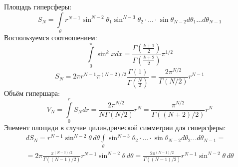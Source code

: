 Площадь гиперсферы:
\[
	S_N = \int\limits_{\theta} r^{N - 1} \sin^{N - 2} \theta_1 \sin^{N - 3} \theta_2 \cdot \ldots \cdot \sin \theta_{N - 2} d\theta_1 \ldots d\theta_{N - 1}
\]
Воспользуемся соотношением:
\[
	\int\limits_0^\pi \sin^k x dx = \frac{\Gamma\left(\frac{k + 1}{2}\right)}{\Gamma\left(\frac{k + 2}{2}\right)} \pi^{1/2}
\]
\[
	S_N = 2 \pi r^{N - 1} \pi^{(N - 2)/2} \frac{\Gamma(1)}{\Gamma\left(\frac{N}{2}\right)} =
	\frac{2 \pi^{N/2}}{\Gamma\left(N/2\right)} r^{N - 1}
\]
Объём гипершара:
\[
	V_N = \int\limits_0^r S_N dr = \frac{2 \pi^{N/2}}{N\Gamma\left(N/2\right)} r^{N} =
	\frac{\pi^{N/2}}{\Gamma\left((N + 2)/2\right)} r^{N}
\]
Элемент площади в случае цилиндрической симметрии для гиперсферы:
\[
	\begin{gathered}
	dS_N = r^{N - 1} \sin^{N - 2} \theta \, d\theta \int\limits_{\theta} \sin^{N - 3} \theta_2 \cdot \ldots \cdot \sin \theta_{N - 2} d\theta_2 \ldots d\theta_{N - 1} 
	= \\ = 
	2 \pi \frac{\pi^{(N - 3)/2}}{\Gamma((N - 1)/2)} r^{N - 1} \sin^{N - 2} \theta \, d\theta =
	\frac{2 \pi^{(N - 1)/2}}{\Gamma((N - 1)/2)} r^{N - 1} \sin^{N - 2} \theta \, d\theta
	\end{gathered}
\]